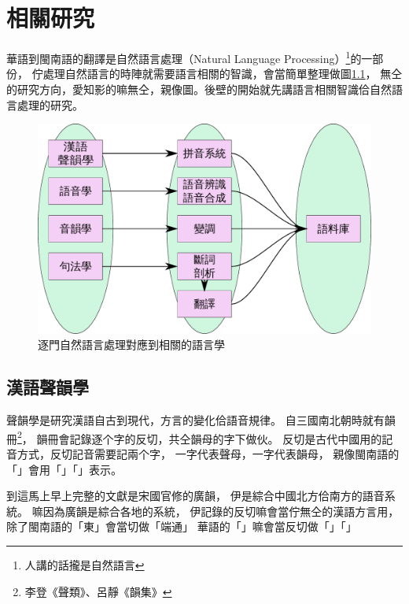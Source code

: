 \documentclass[final,oneside,onecolumn,12pt,a4paper]{book}%
\begin{document}
\chapter{相關研究}
\label{章：相關研究}
華語到閩南語的翻譯是自然語言處理（Natural Language Processing）\footnote{人講的話攏是自然語言}的一部份，
佇處理自然語言的時陣就需要語言相關的智識，會當簡單整理做圖\ref{圖：相關研究智識}，
無仝的研究方向，愛知影的嘛無仝，親像圖。後壁的開始就先講語言相關智識佮自然語言處理的研究。

\begin{figure}
\centerline{\includegraphics[keepaspectratio,width=40em]{圖/相關研究智識}}
\caption{逐門自然語言處理對應到相關的語言學}
\label{圖：相關研究智識}
\end{figure}

\section{漢語聲韻學}
\label{節：漢語聲韻學}
聲韻學是研究漢語自古到現代，方言的變化佮語音規律。
自三國南北朝時就有韻冊\footnote{李登《聲類》、呂靜《韻集》}，
韻冊會記錄逐个字的反切，共仝韻母的字下做伙。
反切是古代中國用的記音方式，反切記音需要記兩个字，
一字代表聲母，一字代表韻母，
親像閩南語的「」會用「」「」表示。%

到這馬上早上完整的文獻是宋國官修的廣韻\cite{廣韻}，
伊是綜合中國北方佮南方的語音系統。
嘛因為廣韻是綜合各地的系統，
伊記錄的反切嘛會當佇無仝的漢語方言用，
除了閩南語的「東」會當切做「端通」
華語的「」嘛會當反切做「」「」
\end{document}
